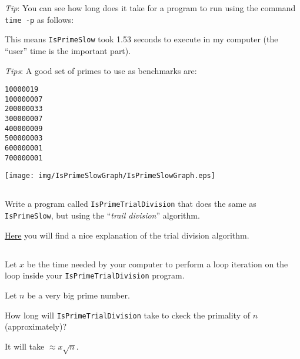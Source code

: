 \documentclass[a4paper, 12pt]{article}
\begin{document}
\textsl{Tip}: You can see how long does it take for a program to run using the
command \texttt{time -p} as follows:


This means \texttt{IsPrimeSlow} took 1.53 seconds to execute in my
computer (the ``user'' time is the important part).

\textsl{Tips}: A good set of primes to use as benchmarks are:

\begin{verbatim}
10000019
100000007
200000033
300000007
400000009
500000003
600000001
700000001
\end{verbatim}

\begin{solution}
  \centering
  \texttt{[image: img/IsPrimeSlowGraph/IsPrimeSlowGraph.eps]}
\end{solution}

\subsection{}

Write a program called \texttt{IsPrimeTrialDivision} that does the same as
\texttt{IsPrimeSlow}, but using the ``\emph{trail division}'' algorithm.

\href{https://www.khanacademy.org/computing/computer-science/cryptography/comp-number-theory/a/trial-divisionalgorithm}{Here}
you will find a nice explanation of the trial division algorithm.


\subsection{}

Let $x$ be the time needed by your computer to perform a loop iteration on the
loop inside your \texttt{IsPrimeTrialDivision} program.

Let $n$ be a very big prime number.

How long will \texttt{IsPrimeTrialDivision} take to ckeck the primality of $n$
(approximately)?

\begin{solution}
It will take $\approx x$.
\end{solution}
\end{document}
